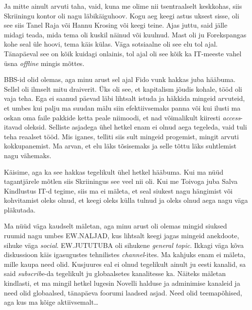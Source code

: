 Ja mitte ainult arvuti taha, vaid, kuna me olime nii tsentraalselt keskkohas, 
siis Skriiningu kontor oli nagu läbikäiguhoov.  Kogu aeg keegi astus uksest 
sisse, oli see siis Tanel Raja või Hannu 
Krosing või keegi teine. Ajas juttu, said jälle 
midagi teada, mida tema oli kuskil näinud või kuulnud. Mast oli ju Forekspangas kohe seal üle hoovi, tema käis külas. Väga 
sotsiaalne oli see elu tol ajal. Tänapäeval see on kõik kuidagi onlainis, tol 
ajal oli see kõik ka IT-meeste vahel üsna \emph{offline} mingis mõttes. 


BBS-id olid olemas, aga minu arust sel ajal Fido vunk hakkas juba hääbuma. 
Sellel oli ilmselt mitu draiverit. Üks oli see, et kapitalism jõudis kohale, 
tööd oli vaja teha. Ega ei saanud päevad läbi lihtsalt istuda ja häkkida 
mingeid arvuteid, et umbes kui palju ma suudan mälu siin efektiivsemaks panna 
või kui ilusti ma oskan oma faile pakkide ketta peale niimoodi, et nad 
võimalikult kiiresti \emph{access}-itavad oleksid. Selliste asjadega ühel 
hetkel enam ei olnud aega tegeleda, vaid tuli teha reaalset tööd. Mis iganes, 
telliti siis sult mingeid progemist, mingit arvuti kokkupanemist. Ma arvan, et  
elu läks  tõsisemaks ja selle tõttu läks  suhtlemist nagu vähemaks. 


Käisime, aga ka see hakkas tegelikult ühel hetkel hääbuma. Kui ma nüüd 
tagantjärele mõtlen siis Skriiningus see veel nii oli. Kui me 
Toivoga juba Salva Kindlustus IT-d tegime, siis ma ei 
mäleta, et seal siukest nagu hängimist või kohvitamist oleks olnud, et keegi 
oleks külla tulnud ja oleks olnud aega nagu väga pläkutada. 


Ma nüüd väga kaudselt mäletan, aga minu arust oli olemas mingid siuksed ruumid 
nagu umbes EW.NALJAD, kus lihtsalt keegi jagas mingeid anekdoote, sihuke väga 
\emph{social}. EW.JUTUTUBA  oli sihukene \emph{general topic}. Ikkagi väga kõva 
diskussioon käis igasugustes tehnilistes 
\emph{channel}-ites. Ma kahjuks enam ei mäleta, mille kaupa need olid. 
Kusjuures eal ei olnud tegelikult ainult ju eesti kanalid, sa said 
\emph{subscribe}-da tegelikult ju globaalsetes kanalitesse ka. Näiteks mäletan 
kindlasti, et  ma mingil hetkel lugesin  Novelli halduse ja adminimise kanaleid 
ja need olid  globaalsed,  tänapäeva foorumi laadsed asjad. Need olid 
teemapõhised, aga kus ma kõige aktiivsemalt\ldots 

